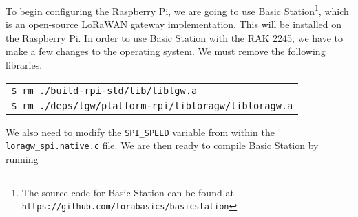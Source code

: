 To begin configuring the Raspberry Pi, we are going to use Basic Station\footnote{The source code for Basic Station can be found at \texttt{https://github.com/lorabasics/basicstation}}, which is an open-source LoRaWAN gateway implementation. This will be installed on the Raspberry Pi. In order to use Basic Station with the RAK 2245, we have to make a few changes to the operating system. We must remove the following libraries.

\begin{tabular}{l}
     \texttt{\$ rm ./build-rpi-std/lib/liblgw.a} \\
     \texttt{\$ rm ./deps/lgw/platform-rpi/libloragw/libloragw.a} \\
\end{tabular}

We also need to modify the \texttt{SPI\_SPEED} variable from within the \texttt{loragw_spi.native.c} file. We are then ready to compile Basic Station by running 
